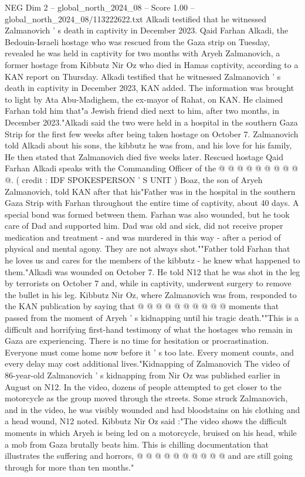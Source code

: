 \begin{textsample}{NEG Dim 2 – global\_north\_2024\_08 – Score 1.00 – global\_north\_2024\_08/113222622.txt}  \label{ex:f2_neg_360}
Alkadi testified that he witnessed Zalmanovich ' s death in captivity in December 2023.
Qaid Farhan Alkadi, the Bedouin-Israeli hostage who was rescued from the Gaza strip on Tuesday, revealed he was held in captivity for two months with Aryeh Zalmanovich, a former hostage from Kibbutz Nir Oz who died in Hamas captivity, according to a KAN report on Thursday.
Alkadi testified that he witnessed Zalmanovich ' s death in captivity in December 2023, KAN added.
The information was brought to light by Ata Abu-Madighem, the ex-mayor of Rahat, on KAN.
He claimed Farhan told him that"a Jewish friend died next to him, after two months, in December 2023."Alkadi said the two were held in a hospital in the southern Gaza Strip for the first few weeks after being taken hostage on October 7.
Zalmanovich told Alkadi about his sons, the kibbutz he was from, and his love for his family, He then stated that Zalmanovich died five weeks later.
Rescued hostage Qaid Farhan Alkadi speaks with the Commanding Officer of the @ @ @ @ @ @ @ @ @ @. ( credit : IDF SPOKESPERSON ' S UNIT ) Boaz, the son of Aryeh Zalmanovich, told KAN after that his"Father was in the hospital in the southern Gaza Strip with Farhan throughout the entire time of captivity, about 40 days.
A special bond was formed between them.
Farhan was also wounded, but he took care of Dad and supported him.
Dad was old and sick, did not receive proper medication and treatment - and was murdered in this way - after a period of physical and mental agony.
They are not always shot.""Father told Farhan that he loves us and cares for the members of the kibbutz - he knew what happened to them."Alkadi was wounded on October 7.
He told N12 that he was shot in the leg by terrorists on October 7 and, while in captivity, underwent surgery to remove the bullet in his leg.
Kibbutz Nir Oz, where Zalmanovich was from, responded to the KAN publication by saying that @ @ @ @ @ @ @ @ @ @ moments that passed from the moment of Aryeh ' s kidnapping until his tragic death.""This is a difficult and horrifying first-hand testimony of what the hostages who remain in Gaza are experiencing.
There is no time for hesitation or procrastination.
Everyone must come home now before it ' s too late.
Every moment counts, and every delay may cost additional lives."Kidnapping of Zalmanovich The video of 86-year-old Zalmanovich ' s kidnapping from Nir Oz was published earlier in August on N12.
In the video, dozens of people attempted to get closer to the motorcycle as the group moved through the streets.
Some struck Zalmanovich, and in the video, he was visibly wounded and had bloodstains on his clothing and a head wound, N12 noted.
Kibbutz Nir Oz said :"The video shows the difficult moments in which Aryeh is being led on a motorcycle, bruised on his head, while a mob from Gaza brutally beats him.
This is chilling documentation that illustrates the suffering and horrors, @ @ @ @ @ @ @ @ @ @ and are still going through for more than ten months."

\end{textsample}
